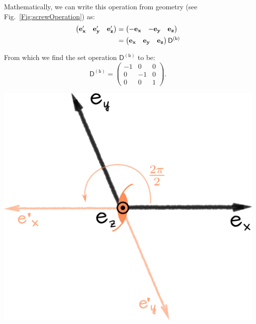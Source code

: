 \noindent \begin{minipage}{0.57\textwidth}

Mathematically, we can write this operation from geometry (see Fig.~\ref{Fig:screwOperation}) as:
\begin{equation*}
\begin{split}
\begin{pmatrix}
\vb{e'_x} & \vb{e'_y} & \vb{e'_z}
\end{pmatrix}
 & =
\begin{pmatrix}
-\vb{e_x} & -\vb{e_y} & \vb{e_z}
\end{pmatrix} \\
&=\begin{pmatrix}
\vb{e_x} & \vb{e_y} & \vb{e_z}
\end{pmatrix}
\mathsf{D^{(b)}}
\end{split}
\end{equation*}

From which we find the set operation $\mathsf{D^{(b)}}$ to be:
\begin{equation}
\mathsf{D^{(b)}} = \begin{pmatrix} 
-1 & 0 & 0\\
0 & -1 & 0 \\
0 & 0 & 1 
\end{pmatrix} .
\label{eq:D_b}
\end{equation}

\end{minipage}
\begin{minipage}{0.4\textwidth}
\vspace{0.3cm}
    \centering
\includegraphics[width=0.9\linewidth]{Figures/screw2.png}
\captionsetup{width=0.7\linewidth}
\label{Fig:screwOperation}
\end{minipage}


